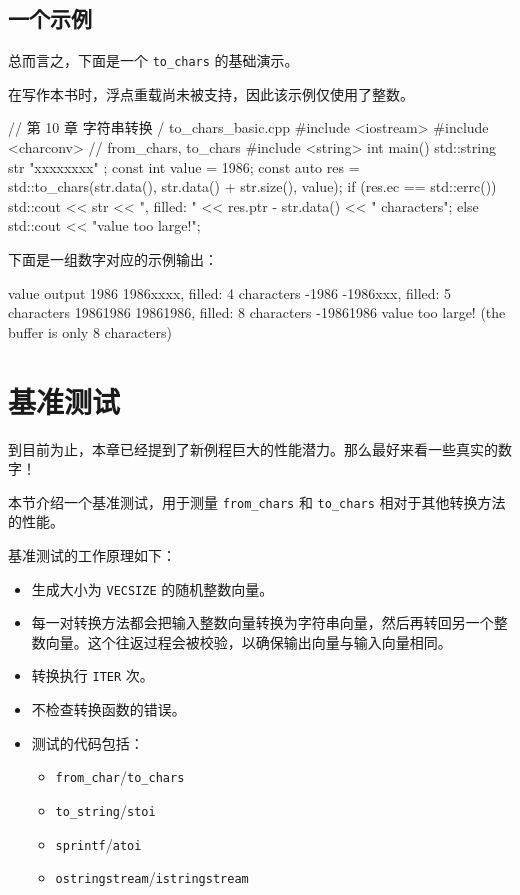 \subsection{一个示例}

总而言之，下面是一个 \texttt{to\_chars} 的基础演示。

在写作本书时，浮点重载尚未被支持，因此该示例仅使用了整数。

\begin{codebox}[cpp]
// 第 10 章 字符串转换 / to_chars_basic.cpp
#include <iostream>
#include <charconv> // from_chars, to_chars
#include <string>
int main()
{
    std::string str { "xxxxxxxx" };
    const int value = 1986;
    const auto res = std::to_chars(str.data(),
                                   str.data() + str.size(),
                                   value);
    if (res.ec == std::errc())
    {
        std::cout << str << ", filled: "
                  << res.ptr - str.data() << " characters\n";
    }
    else
    {
        std::cout << "value too large!\n";
    }
}
\end{codebox}

下面是一组数字对应的示例输出：

\begin{codebox}[cpp]
value
output
1986
1986xxxx, filled: 4 characters
-1986
-1986xxx, filled: 5 characters
19861986
19861986, filled: 8 characters
-19861986
value too large! (the buffer is only 8 characters)
\end{codebox}

\section{基准测试}

到目前为止，本章已经提到了新例程巨大的性能潜力。那么最好来看一些真实的数字！

本节介绍一个基准测试，用于测量 \texttt{from\_chars} 和 \texttt{to\_chars} 相对于其他转换方法的性能。

基准测试的工作原理如下：
\begin{itemize}
\item 生成大小为 \texttt{VECSIZE} 的随机整数向量。
\item 每一对转换方法都会把输入整数向量转换为字符串向量，然后再转回另一个整数向量。这个往返过程会被校验，以确保输出向量与输入向量相同。
\item 转换执行 \texttt{ITER} 次。
\item 不检查转换函数的错误。
\item 测试的代码包括：
  \begin{itemize}
  \item \texttt{from\_char}/\texttt{to\_chars}
  \item \texttt{to\_string}/\texttt{stoi}
  \item \texttt{sprintf}/\texttt{atoi}
  \item \texttt{ostringstream}/\texttt{istringstream}
  \end{itemize}
\end{itemize}

